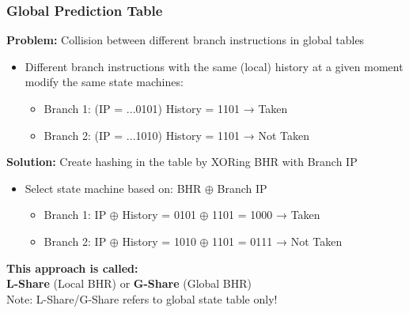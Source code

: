 \documentclass[aspectratio=169,12pt]{beamer}
\begin{document}








\begin{frame}
  \frametitle{Global Prediction Table}
  
  \textbf{Problem:} Collision between different branch instructions in global tables
  
  \begin{itemize}
    \item Different branch instructions with the same (local) history at a given moment modify the same state machines:
    \begin{itemize}
      \item Branch 1: (IP = ...0101) History = 1101 → Taken
      \item Branch 2: (IP = ...1010) History = 1101 → Not Taken
    \end{itemize}
  \end{itemize}
  
  \vspace{0.5em}
  
  \textbf{Solution:} Create hashing in the table by XORing BHR with Branch IP
  \begin{itemize}
    \item Select state machine based on: BHR $\oplus$ Branch IP
    \begin{itemize}
      \item Branch 1: IP $\oplus$ History = 0101 $\oplus$ 1101 = 1000 → Taken
      \item Branch 2: IP $\oplus$ History = 1010 $\oplus$ 1101 = 0111 → Not Taken
    \end{itemize}
  \end{itemize}
  
  \vspace{0.5em}
  
  \begin{tcolorbox}[colback=blue!10, colframe=blue!50]
    \centering
    \textbf{This approach is called:}\\
    \textbf{L-Share} (Local BHR) or \textbf{G-Share} (Global BHR)\\
    \small Note: L-Share/G-Share refers to global state table only!
  \end{tcolorbox}
\end{frame}
\end{document}
